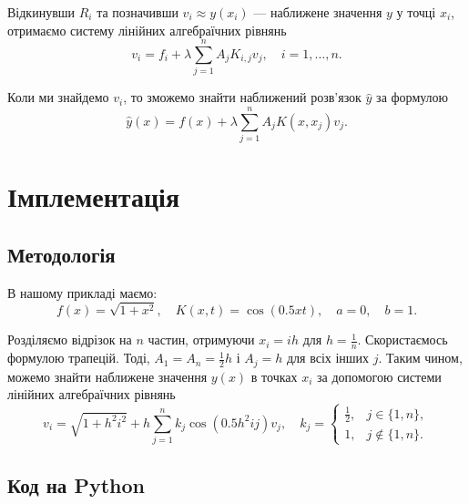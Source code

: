 \documentclass[14pt]{extarticle}
\begin{document}
Відкинувши $R_i$ та позначивши $v_i \approx y(x_i)$ --- наближене значення $y$
у точці $x_i$, отримаємо систему лінійних алгебраїчних рівнянь
\begin{equation*}
    v_i = f_i + \lambda \sum_{j=1}^n A_jK_{i,j}v_j, \quad i=1,\ldots,n.
\end{equation*}

Коли ми знайдемо $v_i$, то зможемо знайти наближений розв'язок $\widehat{y}$ за
формулою
\begin{equation*}
    \widehat{y}(x) = f(x) + \lambda\sum_{j=1}^n A_jK(x,x_j)v_j.
\end{equation*}

\section{Імплементація}

\subsection{Методологія}

В нашому прикладі маємо:
\begin{equation*}
    f(x) = \sqrt{1+x^2}, \quad K(x,t) = \cos(0.5xt), \quad a=0, \quad b=1.
\end{equation*}

Розділяємо відрізок на $n$ частин, отримуючи $x_i = ih$ для $h=\frac{1}{n}$.
Скористаємось формулою трапецій. Тоді, $A_1=A_n=\frac{1}{2}h$ і $A_j=h$ для всіх
інших $j$. Таким чином, можемо знайти наближене значення $y(x)$ в точках 
$x_i$ за допомогою системи лінійних алгебраїчних рівнянь
\begin{equation*}
    v_i = \sqrt{1+h^2i^2} + h\sum_{j=1}^n k_j \cos(0.5h^2ij) v_j, \quad k_j = \begin{cases}
        \frac{1}{2}, & j \in \{1,n\}, \\
        1, & j \not\in \{1,n\}.
    \end{cases}
\end{equation*}

\subsection{Код на Python}
\end{document}
